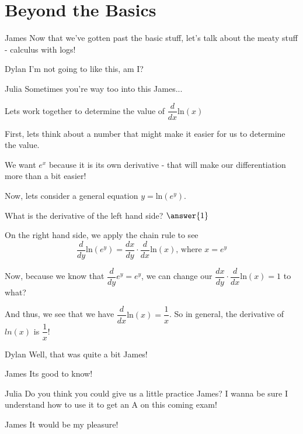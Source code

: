 \documentclass{ximera}
\begin{document}
\section{Beyond the Basics}
\begin{dialogue}
\item[James] Now that we've gotten past the basic stuff, let's talk about the meaty stuff - calculus with logs!
\item[Dylan] I'm not going to like this, am I?
\item[Julia] Sometimes you're way too into this James...
\end{dialogue}
\begin{example}
Lets work together to determine the value of $\dfrac{d}{dx}$ln$(x)$
\begin{explanation}
First, lets think about a number that might make it easier for us to determine the value.
\begin{multipleChoice}
\choice{$\pi$}
\end{multipleChoice}
\begin{feedback}
We want $e^x$ because it is its own derivative - that will make our differentiation more than a bit easier!
\end{feedback}

Now, lets consider a general equation $y = $ln$(e^y)$.

What is the derivative of the left hand side?
$\answer{1}$

On the right hand side, we apply the chain rule to see $$\dfrac{d}{dy} \text{ln}(e^y) = \dfrac{dx}{dy} \cdot \dfrac{d}{dx}\text{ln}(x) \text{, where } x = e^y$$

Now, because we know that $\dfrac{d}{dy}e^y = e^y$, we can change our $\dfrac{dx}{dy}\cdot\dfrac{d}{dx}\text{ln}(x) = 1$ to what?

\begin{multipleChoice}
\end{multipleChoice}
\begin{feedback}
And thus, we see that we have $\dfrac{d}{dx}\text{ln}(x) = \dfrac{1}{x}$. So in general, the derivative of $ln(x)$ is $\dfrac{1}{x}$!
\end{feedback}
\end{explanation}
\end{example}

\begin{dialogue}
\item[Dylan] Well, that was quite a bit James!
\item[James] Its good to know!
\item[Julia] Do you think you could give us a little practice James? I wanna be sure I understand how to use it to get an A on this coming exam!
\item[James] It would be my pleasure!
\end{dialogue}
\end{document}
